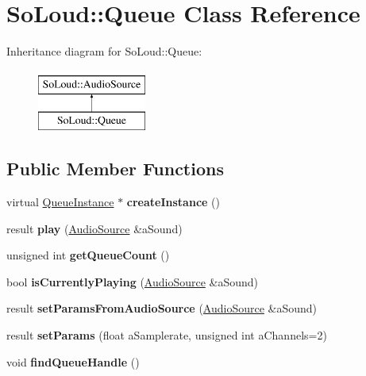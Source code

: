 \hypertarget{class_so_loud_1_1_queue}{}\section{So\+Loud\+::Queue Class Reference}
\label{class_so_loud_1_1_queue}
Inheritance diagram for So\+Loud\+::Queue\+:\begin{figure}[H]
\begin{center}
\leavevmode
\includegraphics[height=2.000000cm]{class_so_loud_1_1_queue}
\end{center}
\end{figure}
\subsection*{Public Member Functions}
\begin{DoxyCompactItemize}
\item 
\mbox{\label{class_so_loud_1_1_queue_a7130d7b786a719ee4a8a8530039901db}} 
virtual \mbox{\hyperlink{class_so_loud_1_1_queue_instance}{Queue\+Instance}} $\ast$ {\bfseries create\+Instance} ()
\item 
\mbox{\label{class_so_loud_1_1_queue_a89a557b1f02b7c04447afbaad1f7786f}} 
result {\bfseries play} (\mbox{\hyperlink{class_so_loud_1_1_audio_source}{Audio\+Source}} \&a\+Sound)
\item 
\mbox{\label{class_so_loud_1_1_queue_a1d7501dcaf87a2d0d30bb32dcf5c0573}} 
unsigned int {\bfseries get\+Queue\+Count} ()
\item 
\mbox{\label{class_so_loud_1_1_queue_ab40a813eefde1b17d081f227b93ad370}} 
bool {\bfseries is\+Currently\+Playing} (\mbox{\hyperlink{class_so_loud_1_1_audio_source}{Audio\+Source}} \&a\+Sound)
\item 
\mbox{\label{class_so_loud_1_1_queue_a0c90166f3f82d9cffb02b440bcdce51b}} 
result {\bfseries set\+Params\+From\+Audio\+Source} (\mbox{\hyperlink{class_so_loud_1_1_audio_source}{Audio\+Source}} \&a\+Sound)
\item 
\mbox{\label{class_so_loud_1_1_queue_a9d0849fb12c8ce174f7ca17e65787f35}} 
result {\bfseries set\+Params} (float a\+Samplerate, unsigned int a\+Channels=2)
\item 
\mbox{\label{class_so_loud_1_1_queue_ac3c36e75e8248d7042a648dda365efc0}} 
void {\bfseries find\+Queue\+Handle} ()
\end{DoxyCompactItemize}
